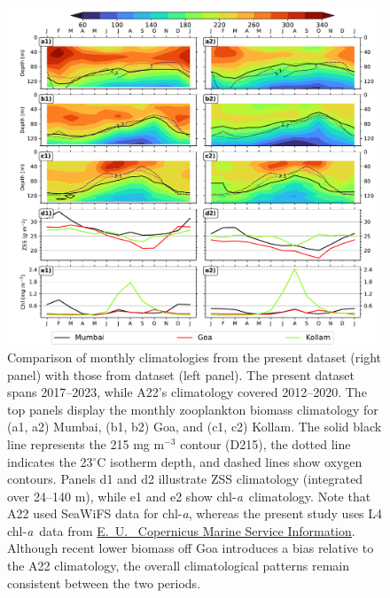 \documentclass[12pt,a4paper]{article}
\newcommand{\chla}{chl-{\emph{a}}}
\begin{document}
\begin{figure}[htbp]
	\centering
	\includegraphics[width=\textwidth]{./fig_s01_climatology_comparison_aparna_ranjan.pdf} 
	\caption{
	Comparison of monthly climatologies from the present dataset (right panel) with those from \citet[A22]{aparna2022seasonal} dataset (left panel). The present dataset spans 2017--2023, while A22's climatology covered 2012--2020. The top panels display the monthly zooplankton biomass climatology for (a1, a2) Mumbai, (b1, b2) Goa, and (c1, c2) Kollam.  The solid black line represents the 215 mg m$^{-3}$ contour (D215), the dotted line indicates the 23$^\circ$C isotherm depth, and dashed lines show oxygen contours.  Panels d1 and d2 illustrate ZSS climatology (integrated over 24--140 m), while e1 and e2 show \chla\ climatology. Note that A22 used SeaWiFS data for \chla, whereas the present study uses L4 \chla\ data from \href{https://doi.org/10.48670/moi-00281}{E.~U.~ Copernicus Marine Service Information}.  Although recent lower biomass off Goa introduces a bias relative to the A22 climatology, the overall climatological patterns remain consistent between the two periods. }
	\label{fig:zsschlclimcomp}
\end{figure}
\end{document}
